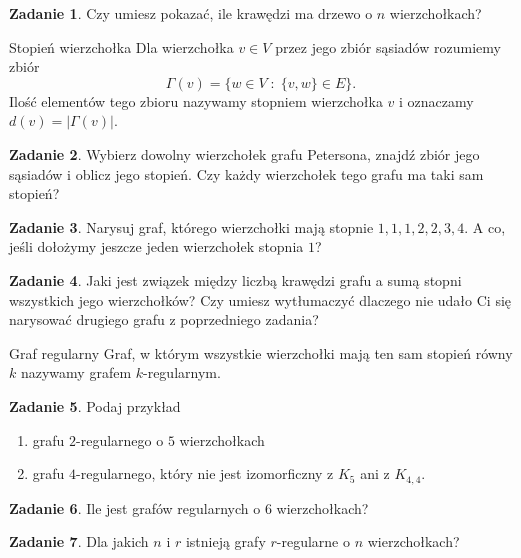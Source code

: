 \documentclass{uoom}
\theoremstyle{definition}
\newtheorem{zadd}{Zadanie}
\newenvironment{zadanie}{
  \begin{zadd}
  }
  {
    \end{zadd}\vspace{\ooodstep}
  }
\begin{document}
\begin{zadanie}
  Czy umiesz pokazać, ile krawędzi ma drzewo o $n$ wierzchołkach?
\end{zadanie}

\begin{mybox}{Stopień wierzchołka}
  Dla wierzchołka $v\in V$ przez jego zbiór sąsiadów rozumiemy zbiór
  $$\Gamma(v)=\{w\in V\;:\;\{v,w\}\in E\}.$$
  Ilość elementów tego zbioru nazywamy stopniem wierzchołka $v$ i oznaczamy $d(v)=|\Gamma(v)|$.
\end{mybox}

\begin{zadanie}
  Wybierz dowolny wierzchołek grafu Petersona, znajdź zbiór jego sąsiadów i oblicz jego stopień. Czy każdy wierzchołek tego grafu ma taki sam stopień?
\end{zadanie}

\begin{zadanie}
  Narysuj graf, którego wierzchołki mają stopnie $1,1,1,2,2,3,4$. A co, jeśli dołożymy jeszcze jeden wierzchołek stopnia $1$?
\end{zadanie}

\begin{zadanie}
  Jaki jest związek między liczbą krawędzi grafu a sumą stopni wszystkich jego wierzchołków? Czy umiesz wytłumaczyć dlaczego nie udało Ci się narysować drugiego grafu z poprzedniego zadania?
\end{zadanie}

\begin{mybox}{Graf regularny}
  Graf, w którym wszystkie wierzchołki mają ten sam stopień równy $k$ nazywamy grafem $k$-regularnym.
\end{mybox}

\begin{zadanie}
  Podaj przykład
  \begin{enumerate}
    \item grafu $2$-regularnego o $5$ wierzchołkach
    \item grafu $4$-regularnego, który nie jest izomorficzny z $K_5$ ani z $K_{4,4}$.
  \end{enumerate}
\end{zadanie}

\begin{zadanie}
  Ile jest grafów regularnych o $6$ wierzchołkach?
\end{zadanie}

\begin{zadanie}
  Dla jakich $n$ i $r$ istnieją grafy $r$-regularne o $n$ wierzchołkach?
\end{zadanie}
\end{document}
